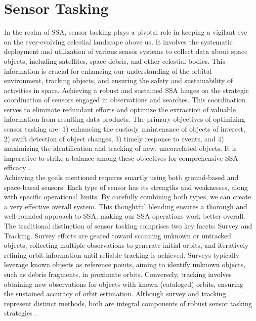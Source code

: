 \section{Sensor Tasking}
In the realm of SSA, sensor tasking plays a pivotal role in keeping a vigilant eye on the ever-evolving 
celestial landscape above us. It involves the systematic deployment and utilization of various sensor systems to collect data about 
space objects, including satellites, space debris, and other celestial bodies. This information is crucial for enhancing our understanding 
of the orbital environment, tracking objects, and ensuring the safety and sustainability of activities in space. Achieving a robust and sustained 
SSA hinges on the strategic coordination of sensors engaged in observations and searches. This coordination serves to eliminate redundant efforts and optimize the extraction of valuable information from resulting data products. The primary objectives of optimizing sensor tasking are: 1) enhancing the custody maintenance of objects of interest, 2) swift detection of object changes, 3) timely response to events, and 4) maximizing the identification and tracking of new, uncorrelated objects. It is imperative to strike a balance among these objectives for comprehensive SSA efficacy \cite{sensor}.\\

Achieving the goals mentioned requires smartly using both ground-based and space-based sensors. Each type of sensor has its strengths and weaknesses, along with specific operational limits. By carefully combining both types, we can create a very effective overall system. This thoughtful blending ensures a thorough and well-rounded approach to SSA, making our SSA operations work better overall.\\

The traditional distinction of sensor tasking comprises two key facets: Survey and Tracking. Survey efforts are geared toward scanning unknown or untracked objects, collecting multiple observations to generate initial orbits, and iteratively refining orbit information until reliable tracking is achieved. Surveys typically leverage known objects as reference points, aiming to identify unknown objects, such as debris fragments, in proximate orbits. Conversely, tracking involves obtaining new observations for objects with known (cataloged) orbits, ensuring the sustained accuracy of orbit estimation. Although survey and tracking represent distinct methods, both are integral components of robust sensor tasking strategies \cite{nsga}.\\

